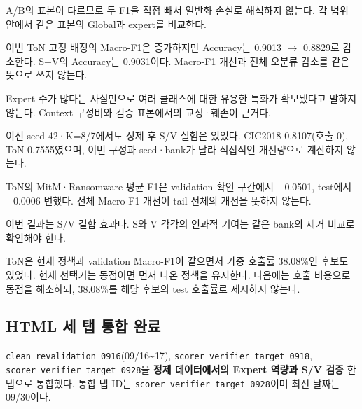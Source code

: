 \par\noindent \textbullet\enspace A/\allowbreak{}B의 표본이 다르므로 두 F1을 직접 빼서 일반화 손실로 해석하지 않는다. 각 범위 안에서 같은 표본의 Global과 expert를 비교한다.


\par\noindent \textbullet\enspace 이번 ToN 고정 배정의 Macro-F1은 증가하지만 Accuracy는 0.9013  \ensuremath{\rightarrow}  0.8829로 감소한다. S+\allowbreak{}V의 Accuracy는 0.9031이다. Macro-F1 개선과 전체 오분류 감소를 같은 뜻으로 쓰지 않는다.


\par\noindent \textbullet\enspace Expert 수가 많다는 사실만으로 여러 클래스에 대한 유용한 특화가 확보됐다고 말하지 않는다. Context 구성비와 검증 표본에서의 교정·훼손이 근거다.


\par\noindent \textbullet\enspace 이전 seed 42·K=\allowbreak{}8/\allowbreak{}7에서도 정제 후 S/\allowbreak{}V 실험은 있었다. CIC2018 0.8107(호출 0), ToN 0.7555였으며, 이번 구성과 seed·bank가 달라 직접적인 개선량으로 계산하지 않는다.


\par\noindent \textbullet\enspace ToN의 MitM·Ransomware 평균 F1은 validation 확인 구간에서 −0.0501, test에서 −0.0006 변했다. 전체 Macro-F1 개선이 tail 전체의 개선을 뜻하지 않는다.


\par\noindent \textbullet\enspace 이번 결과는 S/\allowbreak{}V 결합 효과다. S와 V 각각의 인과적 기여는 같은 bank의 제거 비교로 확인해야 한다.


\par\noindent \textbullet\enspace ToN은 현재 정책과 validation Macro-F1이 같으면서 가중 호출률 38.08\%인 후보도 있었다. 현재 선택기는 동점이면 먼저 나온 정책을 유지한다. 다음에는 호출 비용으로 동점을 해소하되, 38.08\%를 해당 후보의 test 호출률로 제시하지 않는다.


\subsection{HTML 세 탭 통합 완료}
\texttt{clean\_\allowbreak{}\allowbreak{}re\allowbreak{}validati\allowbreak{}on\_\allowbreak{}\allowbreak{}0916}(09/\allowbreak{}16\textasciitilde{}17), \texttt{scorer\_\allowbreak{}\allowbreak{}v\allowbreak{}erifier\_\allowbreak{}\allowbreak{}target\_\allowbreak{}\allowbreak{}0\allowbreak{}918}, \texttt{scorer\_\allowbreak{}\allowbreak{}v\allowbreak{}erifier\_\allowbreak{}\allowbreak{}target\_\allowbreak{}\allowbreak{}0\allowbreak{}928}을 \textbf{정제 데이터에서의 Expert 역량과 S/\allowbreak{}V 검증} 한 탭으로 통합했다. 통합 탭 ID는 \texttt{scorer\_\allowbreak{}\allowbreak{}v\allowbreak{}erifier\_\allowbreak{}\allowbreak{}target\_\allowbreak{}\allowbreak{}0\allowbreak{}928}이며 최신 날짜는 09/\allowbreak{}30이다.

